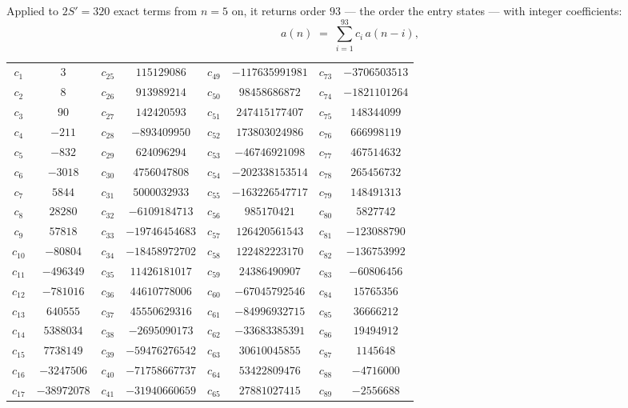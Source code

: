 \documentclass[11pt,a4paper]{article}
\theoremstyle{plain}
\theoremstyle{definition}
\begin{document}
Applied to $2S'=320$ exact terms from $n=5$ on, it returns order $93$ --- the
order the entry states --- with integer coefficients:
\[
a(n)\;=\;\sum_{i=1}^{93}c_i\,a(n-i),
\]
\begin{center}\small
\begin{tabular}{cccccccc}
$c_{1}$ & $3$ & $c_{25}$ & $115129086$ & $c_{49}$ & $-117635991981$ & $c_{73}$ & $-3706503513$ \\
$c_{2}$ & $8$ & $c_{26}$ & $913989214$ & $c_{50}$ & $98458686872$ & $c_{74}$ & $-1821101264$ \\
$c_{3}$ & $90$ & $c_{27}$ & $142420593$ & $c_{51}$ & $247415177407$ & $c_{75}$ & $148344099$ \\
$c_{4}$ & $-211$ & $c_{28}$ & $-893409950$ & $c_{52}$ & $173803024986$ & $c_{76}$ & $666998119$ \\
$c_{5}$ & $-832$ & $c_{29}$ & $624096294$ & $c_{53}$ & $-46746921098$ & $c_{77}$ & $467514632$ \\
$c_{6}$ & $-3018$ & $c_{30}$ & $4756047808$ & $c_{54}$ & $-202338153514$ & $c_{78}$ & $265456732$ \\
$c_{7}$ & $5844$ & $c_{31}$ & $5000032933$ & $c_{55}$ & $-163226547717$ & $c_{79}$ & $148491313$ \\
$c_{8}$ & $28280$ & $c_{32}$ & $-6109184713$ & $c_{56}$ & $985170421$ & $c_{80}$ & $5827742$ \\
$c_{9}$ & $57818$ & $c_{33}$ & $-19746454683$ & $c_{57}$ & $126420561543$ & $c_{81}$ & $-123088790$ \\
$c_{10}$ & $-80804$ & $c_{34}$ & $-18458972702$ & $c_{58}$ & $122482223170$ & $c_{82}$ & $-136753992$ \\
$c_{11}$ & $-496349$ & $c_{35}$ & $11426181017$ & $c_{59}$ & $24386490907$ & $c_{83}$ & $-60806456$ \\
$c_{12}$ & $-781016$ & $c_{36}$ & $44610778006$ & $c_{60}$ & $-67045792546$ & $c_{84}$ & $15765356$ \\
$c_{13}$ & $640555$ & $c_{37}$ & $45550629316$ & $c_{61}$ & $-84996932715$ & $c_{85}$ & $36666212$ \\
$c_{14}$ & $5388034$ & $c_{38}$ & $-2695090173$ & $c_{62}$ & $-33683385391$ & $c_{86}$ & $19494912$ \\
$c_{15}$ & $7738149$ & $c_{39}$ & $-59476276542$ & $c_{63}$ & $30610045855$ & $c_{87}$ & $1145648$ \\
$c_{16}$ & $-3247506$ & $c_{40}$ & $-71758667737$ & $c_{64}$ & $53422809476$ & $c_{88}$ & $-4716000$ \\
$c_{17}$ & $-38972078$ & $c_{41}$ & $-31940660659$ & $c_{65}$ & $27881027415$ & $c_{89}$ & $-2556688$ \\

\end{tabular}
\end{center}
\end{document}
